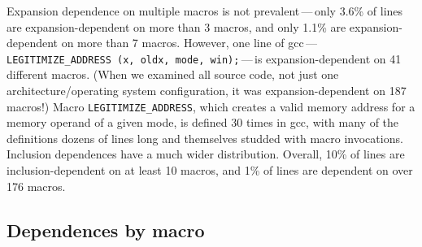 \documentclass[10pt]{article}
\newcommand{\comment}[1]{\textbf{[[#1]]}}
\newcommand{\pkg}[1]{\textsf{#1}}
\begin{document}
Expansion dependence on multiple macros is not prevalent\,---\,only 3.6\% of
lines are expansion-dependent on more than 3 macros, and only 1.1\% are
expansion-dependent on more than 7 macros.  However, one line of
\pkg{gcc}\,---\,{\tt \verb|LEGITIMIZE_ADDRESS| (x, oldx, mode,
win);}\,---\,is expansion-dependent on 41 different macros.  (When we
examined all source code, not just one architecture/operating system configuration, it
was expansion-dependent on 187 macros!)  Macro \verb|LEGITIMIZE_ADDRESS|, which
creates a valid memory address for a memory operand of a given mode,
is defined 30 times in \pkg{gcc}, with many of the definitions dozens of
lines long and themselves studded with macro invocations.
Inclusion dependences have a much wider distribution.  Overall, 10\% of lines
are inclusion-dependent on at least 10 macros, and 1\% of lines are
dependent on over 176 macros.



\subsection{Dependences by macro}
\end{document}
